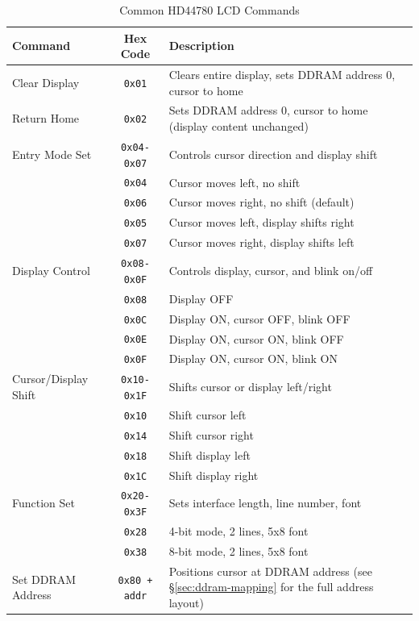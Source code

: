 \begin{table}[H]
\centering
\small
\renewcommand{\arraystretch}{1.3}
\begin{tabular}{lcp{7.5cm}}
\toprule
\textbf{Command} & \textbf{Hex Code} & \textbf{Description} \\
\midrule
Clear Display & \texttt{0x01} & Clears entire display, sets DDRAM address 0, cursor to home \\
Return Home & \texttt{0x02} & Sets DDRAM address 0, cursor to home (display content unchanged) \\
\midrule
Entry Mode Set & \texttt{0x04-0x07} & Controls cursor direction and display shift \\
 & \texttt{0x04} & Cursor moves left, no shift \\
 & \texttt{0x06} & Cursor moves right, no shift (default) \\
 & \texttt{0x05} & Cursor moves left, display shifts right \\
 & \texttt{0x07} & Cursor moves right, display shifts left \\
\midrule
Display Control & \texttt{0x08-0x0F} & Controls display, cursor, and blink on/off \\
 & \texttt{0x08} & Display OFF \\
 & \texttt{0x0C} & Display ON, cursor OFF, blink OFF \\
 & \texttt{0x0E} & Display ON, cursor ON, blink OFF \\
 & \texttt{0x0F} & Display ON, cursor ON, blink ON \\
\midrule
Cursor/Display Shift & \texttt{0x10-0x1F} & Shifts cursor or display left/right \\
 & \texttt{0x10} & Shift cursor left \\
 & \texttt{0x14} & Shift cursor right \\
 & \texttt{0x18} & Shift display left \\
 & \texttt{0x1C} & Shift display right \\
\midrule
Function Set & \texttt{0x20-0x3F} & Sets interface length, line number, font \\
 & \texttt{0x28} & 4-bit mode, 2 lines, 5x8 font \\
 & \texttt{0x38} & 8-bit mode, 2 lines, 5x8 font \\
\midrule
Set DDRAM Address & \texttt{0x80 + addr} & Positions cursor at DDRAM address (see \S\ref{sec:ddram-mapping} for the full address layout) \\
\bottomrule
\end{tabular}
\caption{Common HD44780 LCD Commands}
\end{table}

